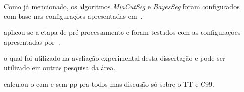 










Como já mencionado, os algoritmos \textit{MinCutSeg} e \textit{BayesSeg} foram configurados com base nas configurações apresentadas em~\cite{Eis2008}. 





aplicou-se a etapa de pré-processamento e foram testados com as configurações apresentadas por~\cite{Eis2008}. 































o qual foi utilizado na avaliação experimental desta dissertação e pode ser utilizado em outras pesquisa da área.









































calculou o com e sem pp pra todos
mas discusão só sobre o TT e C99.

